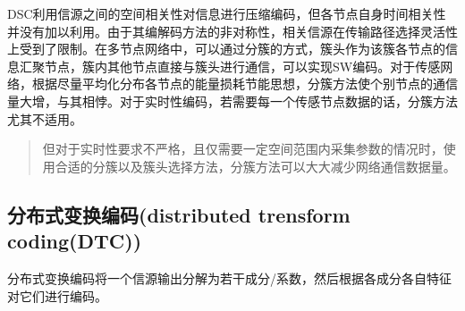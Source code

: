 DSC利用信源之间的空间相关性对信息进行压缩编码，但各节点自身时间相关性并没有加以利用。由于其编解码方法的非对称性，相关信源在传输路径选择灵活性上受到了限制。在多节点网络中，可以通过分簇的方式，簇头作为该簇各节点的信息汇聚节点，簇内其他节点直接与簇头进行通信，可以实现SW编码。\textcolor[rgb]{0,0,1}{对于传感网络，根据尽量平均化分布各节点的能量损耗节能思想，分簇方法使个别节点的通信量大增，与其相悖。对于实时性编码，若需要每一个传感节点数据的话，分簇方法尤其不适用}。
\begin{quote}
    但对于实时性要求不严格，且仅需要一定空间范围内采集参数的情况时，使用合适的分簇以及簇头选择方法，分簇方法可以大大减少网络通信数据量。
\end{quote}

\subsection{分布式变换编码(distributed trensform coding(DTC))}

分布式变换编码将一个信源输出分解为若干成分/系数，然后根据各成分各自特征对它们进行编码。
